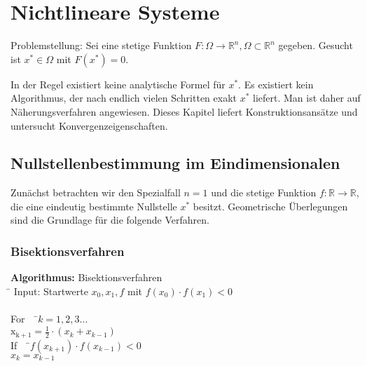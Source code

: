\section{Nichtlineare Systeme}

Problemstellung: Sei eine stetige Funktion
$F: \Omega \longrightarrow \mathbb{R}^n, \Omega \subset \mathbb{R}^n$ gegeben.
Gesucht ist $x^*\in \Omega$ mit $F(x^*)=0$.
\newline

\begin{bemerkung}
In der Regel existiert keine analytische Formel für $x^*$.
Es existiert kein Algorithmus, der nach endlich vielen Schritten exakt $x^*$
liefert.  Man ist daher auf Näherungsverfahren angewiesen.  Dieses Kapitel
liefert Konstruktionsansätze und untersucht Konvergenzeigenschaften.
\end{bemerkung}

\subsection{Nullstellenbestimmung im Eindimensionalen}

Zunächst betrachten wir den Spezialfall $n=1$ und die stetige Funktion $f:
\mathbb{R} \longrightarrow \mathbb{R}$, die eine eindeutig bestimmte Nullstelle
$x^*$ besitzt. Geometrische Überlegungen sind die Grundlage für die folgende
Verfahren.


\subsubsection{Bisektionsverfahren}

\begin{tabbing}
\textbf{Algorithmus:} Bisektionsverfahren\\
\= \kill
Input: Startwerte $x_0, x_1, f$ mit $f(x_0) \cdot f(x_1) <0$\\
\newline
\\\> For \ \ \=$k=1,2,3...$\\ 
\> \> $\mathrm{x_{k+1}}= \frac{1}{2} \cdot (x_k + x_{k-1})$ \\
\> \> If \ \ \=$f(x_{k+1})\cdot f(x_{k-1})<0$\\
\> \> \> $x_k=x_{k-1}$ \\
\end{tabbing}

